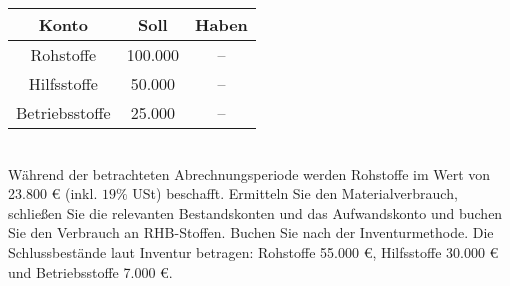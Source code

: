 \documentclass[paper=a4, fontsize=11pt]{scrartcl}
\numberwithin{equation}{section}
\numberwithin{figure}{section}
\numberwithin{table}{section}
\begin{document}
\begin{tabular}{|c|cc|}
\hline
Konto & Soll & Haben \\\hline
Rohstoffe & 100.000 & -- \\
Hilfsstoffe & 50.000 & -- \\
Betriebsstoffe & 25.000 & -- \\\hline
\end{tabular} \\

Während der betrachteten Abrechnungsperiode werden Rohstoffe im Wert von 23.800 € (inkl. $19 \%$ USt) beschafft. Ermitteln Sie den Materialverbrauch, schließen Sie die relevanten Bestandskonten und das Aufwandskonto und buchen Sie den Verbrauch an RHB-Stoffen. Buchen Sie nach der Inventurmethode. Die Schlussbestände laut Inventur betragen: Rohstoffe 55.000 €, Hilfsstoffe 30.000 € und Betriebsstoffe 7.000 €. \\
\end{document}
